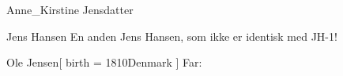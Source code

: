 \documentclass[
	twocolumn
]{article}
\begin{document}
\begin{gprProfile}{Anne_Kirstine Jensdatter}
	\gprGivenName

\end{gprProfile}

\begin{gprProfile}{Jens Hansen}
	En anden Jens Hansen, som ikke er identisk med JH-1!
\end{gprProfile}



\begin{gprProfile}{Ole Jensen}[
	birth = {1810}{Denmark}
]
	Far:
\end{gprProfile}

\printindex[gpr-id]
\end{document}
